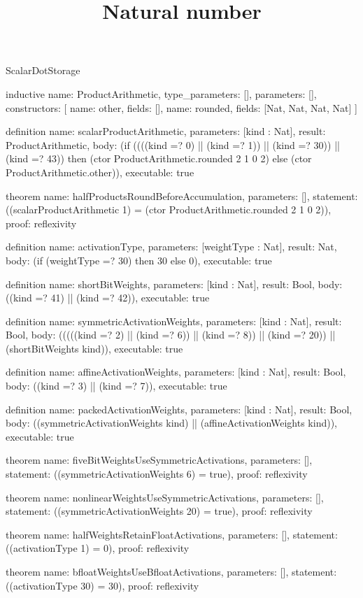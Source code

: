 \begin{lexlean}{ScalarDotStorage}
\title{Natural number}
\begin{semanticmodule}
inductive{
  name: ProductArithmetic,
  type_parameters: [],
  parameters: [],
  constructors: [
    {name: other, fields: []},
    {name: rounded, fields: [Nat, Nat, Nat, Nat]}
  ]
}

definition{
  name: scalarProductArithmetic,
  parameters: [kind : Nat],
  result: ProductArithmetic,
  body: (if ((((kind =? 0) || (kind =? 1)) || (kind =? 30)) || (kind =? 43)) then
    (ctor ProductArithmetic.rounded 2 1 0 2) else (ctor ProductArithmetic.other)),
  executable: true
}

theorem{
  name: halfProductsRoundBeforeAccumulation,
  parameters: [],
  statement: ((scalarProductArithmetic 1) = (ctor ProductArithmetic.rounded 2 1 0 2)),
  proof: reflexivity{}
}

definition{
  name: activationType,
  parameters: [weightType : Nat],
  result: Nat,
  body: (if (weightType =? 30) then 30 else 0),
  executable: true
}

definition{
  name: shortBitWeights,
  parameters: [kind : Nat],
  result: Bool,
  body: ((kind =? 41) || (kind =? 42)),
  executable: true
}

definition{
  name: symmetricActivationWeights,
  parameters: [kind : Nat],
  result: Bool,
  body: (((((kind =? 2) || (kind =? 6)) || (kind =? 8)) || (kind =? 20)) || (shortBitWeights kind)),
  executable: true
}

definition{
  name: affineActivationWeights,
  parameters: [kind : Nat],
  result: Bool,
  body: ((kind =? 3) || (kind =? 7)),
  executable: true
}

definition{
  name: packedActivationWeights,
  parameters: [kind : Nat],
  result: Bool,
  body: ((symmetricActivationWeights kind) || (affineActivationWeights kind)),
  executable: true
}

theorem{
  name: fiveBitWeightsUseSymmetricActivations,
  parameters: [],
  statement: ((symmetricActivationWeights 6) = true),
  proof: reflexivity{}
}

theorem{
  name: nonlinearWeightsUseSymmetricActivations,
  parameters: [],
  statement: ((symmetricActivationWeights 20) = true),
  proof: reflexivity{}
}

theorem{
  name: halfWeightsRetainFloatActivations,
  parameters: [],
  statement: ((activationType 1) = 0),
  proof: reflexivity{}
}

theorem{
  name: bfloatWeightsUseBfloatActivations,
  parameters: [],
  statement: ((activationType 30) = 30),
  proof: reflexivity{}
}
\end{semanticmodule}
\end{lexlean}
